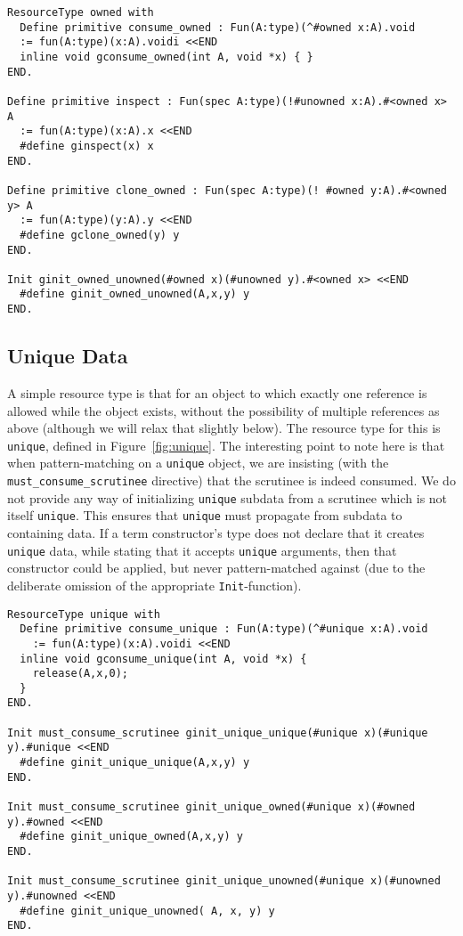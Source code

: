 \documentclass[9pt,natbib]{sigplanconf}
\begin{document}
\begin{figure*}
\small
\begin{verbatim}
ResourceType owned with 
  Define primitive consume_owned : Fun(A:type)(^#owned x:A).void
  := fun(A:type)(x:A).voidi <<END
  inline void gconsume_owned(int A, void *x) { }
END.

Define primitive inspect : Fun(spec A:type)(!#unowned x:A).#<owned x> A 
  := fun(A:type)(x:A).x <<END
  #define ginspect(x) x
END.

Define primitive clone_owned : Fun(spec A:type)(! #owned y:A).#<owned y> A
  := fun(A:type)(y:A).y <<END
  #define gclone_owned(y) y
END.

Init ginit_owned_unowned(#owned x)(#unowned y).#<owned x> <<END
  #define ginit_owned_unowned(A,x,y) y
END.
\end{verbatim}
\caption{The \texttt{owned} resource type (selected primitives)}
\label{fig:owned}
\end{figure*}

\subsection{Unique Data}

A simple resource type is that for an object to which exactly one
reference is allowed while the object exists, without the possibility
of multiple references as above (although we will relax that slightly
below).  The resource type for this is \texttt{unique}, defined in
Figure~\ref{fig:unique}.  The interesting point to note here is that
when pattern-matching on a \texttt{unique} object, we are insisting
(with the \texttt{must\_consume\_scrutinee} directive) that the
scrutinee is indeed consumed.  We do not provide any way of
initializing \texttt{unique} subdata from a scrutinee which is not
itself \texttt{unique}.  This ensures that \texttt{unique} must
propagate from subdata to containing data.  If a term constructor's
type does not declare that it creates \texttt{unique} data, while
stating that it accepts \texttt{unique} arguments, then that
constructor could be applied, but never pattern-matched against (due
to the deliberate omission of the appropriate \texttt{Init}-function).

\begin{figure*}
\small
\begin{verbatim}
ResourceType unique with
  Define primitive consume_unique : Fun(A:type)(^#unique x:A).void
    := fun(A:type)(x:A).voidi <<END
  inline void gconsume_unique(int A, void *x) {
    release(A,x,0);
  }
END.

Init must_consume_scrutinee ginit_unique_unique(#unique x)(#unique y).#unique <<END
  #define ginit_unique_unique(A,x,y) y
END.

Init must_consume_scrutinee ginit_unique_owned(#unique x)(#owned y).#owned <<END
  #define ginit_unique_owned(A,x,y) y
END.

Init must_consume_scrutinee ginit_unique_unowned(#unique x)(#unowned y).#unowned <<END
  #define ginit_unique_unowned( A, x, y) y
END.
\end{verbatim}
\caption{The \texttt{unique} resource type}
\label{fig:unique}
\end{figure*}
\end{document}
